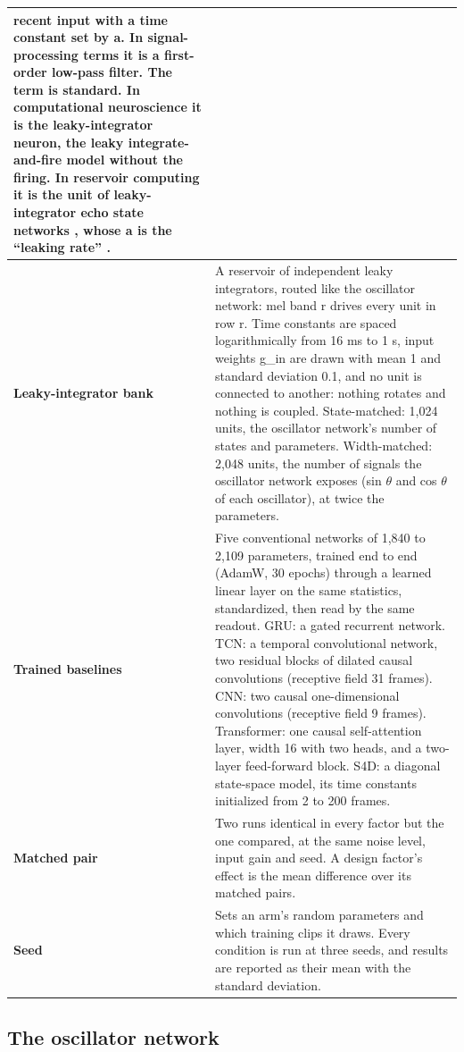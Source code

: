 \documentclass{article}
\begin{document}
{\begin{longtable}[]{@{}
  >{\raggedright\arraybackslash}p{}
  >{\raggedright\arraybackslash}p{}@{}}
recent input with a time constant set by a. In signal-processing terms
it is a first-order low-pass filter. The term is standard. In
computational neuroscience it is the leaky-integrator neuron, the leaky
integrate-and-fire model without the firing. In reservoir computing it
is the unit of leaky-integrator echo state networks \citep{jaeger2007},
whose a is the ``leaking rate'' \citep{lukosevicius2012}. \\
\cmidrule{1-2}\textbf{Leaky-integrator bank} & A reservoir of
independent leaky integrators, routed like the oscillator network: mel
band r drives every unit in row r. Time constants are spaced
logarithmically from 16 ms to 1 s, input weights g\_in are drawn with
mean 1 and standard deviation 0.1, and no unit is connected to another:
nothing rotates and nothing is coupled. State-matched: 1,024 units, the
oscillator network's number of states and parameters. Width-matched:
2,048 units, the number of signals the oscillator network exposes (sin
\ensuremath{\theta} and cos \ensuremath{\theta} of each oscillator), at
twice the parameters. \\
\cmidrule{1-2}\textbf{Trained baselines} & Five conventional networks of
1,840 to 2,109 parameters, trained end to end (AdamW, 30 epochs) through
a learned linear layer on the same statistics, standardized, then read
by the same readout. GRU: a gated recurrent network. TCN: a temporal
convolutional network, two residual blocks of dilated causal
convolutions (receptive field 31 frames). CNN: two causal
one-dimensional convolutions (receptive field 9 frames). Transformer:
one causal self-attention layer, width 16 with two heads, and a
two-layer feed-forward block. S4D: a diagonal state-space model, its
time constants initialized from 2 to 200 frames. \\
\cmidrule{1-2}\textbf{Matched pair} & Two runs identical in every factor
but the one compared, at the same noise level, input gain and seed. A
design factor's effect is the mean difference over its matched pairs. \\
\cmidrule{1-2}\textbf{Seed} & Sets an arm's random parameters and which
training clips it draws. Every condition is run at three seeds, and
results are reported as their mean with the standard deviation. \\
\end{longtable}
}

\subsection{The oscillator network}\label{sec-A-3}
\end{document}
